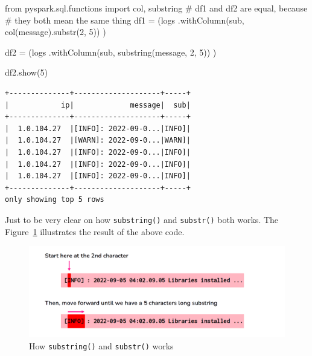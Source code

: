 \documentclass[
  11pt,
  letterpaper,
  DIV=11,
  numbers=noendperiod]{scrreprt}
\newenvironment{Shaded}{\begin{snugshade}}{\end{snugshade}}
\newcommand{\CommentTok}[1]{\textcolor[rgb]{0.37,0.37,0.37}{#1}}
\newcommand{\DecValTok}[1]{\textcolor[rgb]{0.68,0.00,0.00}{#1}}
\newcommand{\ImportTok}[1]{\textcolor[rgb]{0.00,0.46,0.62}{#1}}
\newcommand{\NormalTok}[1]{\textcolor[rgb]{0.00,0.23,0.31}{#1}}
\newcommand{\OperatorTok}[1]{\textcolor[rgb]{0.37,0.37,0.37}{#1}}
\newcommand{\StringTok}[1]{\textcolor[rgb]{0.13,0.47,0.30}{#1}}
\begin{document}
\begin{Shaded}
\begin{Highlighting}[]
\ImportTok{from}\NormalTok{ pyspark.sql.functions }\ImportTok{import}\NormalTok{ col, substring}
\CommentTok{\# \textasciigrave{}df1\textasciigrave{} and \textasciigrave{}df2\textasciigrave{} are equal, because}
\CommentTok{\# they both mean the same thing}
\NormalTok{df1 }\OperatorTok{=}\NormalTok{ (logs}
\NormalTok{    .withColumn(}\StringTok{\textquotesingle{}sub\textquotesingle{}}\NormalTok{, col(}\StringTok{\textquotesingle{}message\textquotesingle{}}\NormalTok{).substr(}\DecValTok{2}\NormalTok{, }\DecValTok{5}\NormalTok{))}
\NormalTok{)}

\NormalTok{df2 }\OperatorTok{=}\NormalTok{ (logs}
\NormalTok{    .withColumn(}\StringTok{\textquotesingle{}sub\textquotesingle{}}\NormalTok{, substring(}\StringTok{\textquotesingle{}message\textquotesingle{}}\NormalTok{, }\DecValTok{2}\NormalTok{, }\DecValTok{5}\NormalTok{))}
\NormalTok{)}

\NormalTok{df2.show(}\DecValTok{5}\NormalTok{)}
\end{Highlighting}
\end{Shaded}

\begin{verbatim}
+--------------+--------------------+-----+
|            ip|             message|  sub|
+--------------+--------------------+-----+
|  1.0.104.27  |[INFO]: 2022-09-0...|INFO]|
|  1.0.104.27  |[WARN]: 2022-09-0...|WARN]|
|  1.0.104.27  |[INFO]: 2022-09-0...|INFO]|
|  1.0.104.27  |[INFO]: 2022-09-0...|INFO]|
|  1.0.104.27  |[INFO]: 2022-09-0...|INFO]|
+--------------+--------------------+-----+
only showing top 5 rows
\end{verbatim}

Just to be very clear on how \texttt{substring()} and \texttt{substr()}
both works. The Figure~\ref{fig-substring-start-length} illustrates the
result of the above code.

\begin{figure}

{\centering \includegraphics{Chapters/./../Figures/substring-start-length.png}

}

\caption{\label{fig-substring-start-length}How \texttt{substring()} and
\texttt{substr()} works}

\end{figure}
\end{document}
